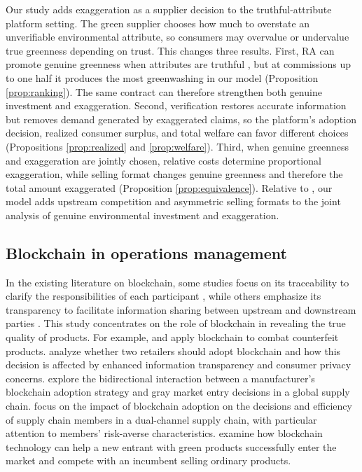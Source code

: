\documentclass[preprint,review,12pt,authoryear,nopreprintline]{elsarticle}
\theoremstyle{definition}
\begin{document}
Our study adds exaggeration as a supplier decision to the truthful-attribute platform setting. The green supplier chooses how much to overstate an unverifiable environmental attribute, so consumers may overvalue or undervalue true greenness depending on trust. This changes three results. First, RA can promote genuine greenness when attributes are truthful \citep{wu2025platform}, but at commissions up to one half it produces the most greenwashing in our model (Proposition \ref{prop:ranking}). The same contract can therefore strengthen both genuine investment and exaggeration. Second, verification restores accurate information but removes demand generated by exaggerated claims, so the platform's adoption decision, realized consumer surplus, and total welfare can favor different choices (Propositions \ref{prop:realized} and \ref{prop:welfare}). Third, when genuine greenness and exaggeration are jointly chosen, relative costs determine proportional exaggeration, while selling format changes genuine greenness and therefore the total amount exaggerated (Proposition \ref{prop:equivalence}). Relative to \citet{xu2025should}, our model adds upstream competition and asymmetric selling formats to the joint analysis of genuine environmental investment and exaggeration.

\subsection{Blockchain in operations management}\label{sec:2.3}

In the existing literature on blockchain, some studies focus on its traceability to clarify the responsibilities of each participant \citep{Iyengar2024,cui2023value,dong2023impact}, while others emphasize its transparency to facilitate information sharing between upstream and downstream parties \citep{cui2024supply,Keskin2025the}. This study concentrates on the role of blockchain in revealing the true quality of products. For example, \citet{pun2021blockchain} and \citet{shen2022combat} apply blockchain to combat counterfeit products. \citet{zhang2022price} analyze whether two retailers should adopt blockchain and how this decision is affected by enhanced information transparency and consumer privacy concerns. \citet{zhang2023blockchain} explore the bidirectional interaction between a manufacturer's blockchain adoption strategy and gray market entry decisions in a global supply chain. \citet{zhang2023the} focus on the impact of blockchain adoption on the decisions and efficiency of supply chain members in a dual-channel supply chain, with particular attention to members' risk-averse characteristics. \citet{wu2024blockchain} examine how blockchain technology can help a new entrant with green products successfully enter the market and compete with an incumbent selling ordinary products.
\end{document}
